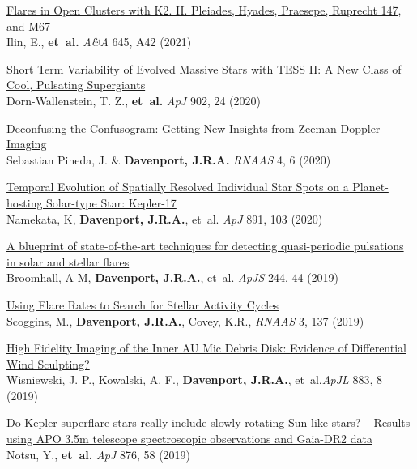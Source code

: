 \documentclass{article}
\begin{document}
\begin{llist}
\begin{etaremune}[leftmargin=10pt]
\item{\sc \href{https://arxiv.org/abs/2010.05576}{\color{blue} Flares in Open Clusters with K2. II. Pleiades, Hyades, Praesepe, Ruprecht 147, and M67}}\\
Ilin, E., {\bf et~al.} {\em A\&A} 645, A42 (2021)


\item{\sc \href{https://arxiv.org/abs/2008.11723}{\color{blue} Short Term Variability of Evolved Massive Stars with TESS II: A New Class of Cool, Pulsating Supergiants }}\\
Dorn-Wallenstein, T. Z., {\bf et~al.} {\em ApJ} 902, 24 (2020)

\item{\sc \href{https://iopscience.iop.org/article/10.3847/2515-5172/ab98f4}{\color{blue} Deconfusing the Confusogram: Getting New Insights from Zeeman Doppler Imaging}}\\
Sebastian Pineda, J. \& {\bf Davenport,  J.R.A.} {\em RNAAS} 4, 6 (2020)

\item{\sc \href{https://ui.adsabs.harvard.edu/abs/2020ApJ...891..103N}{\color{blue} Temporal Evolution of Spatially Resolved Individual Star Spots on a Planet-hosting Solar-type Star: Kepler-17}}\\
Namekata, K, {\bf Davenport,  J.R.A.}, et~al. {\em ApJ} 891, 103 (2020)


\item{\sc \href{https://arxiv.org/abs/1910.08458}{\color{blue} A blueprint of state-of-the-art techniques for detecting quasi-periodic pulsations in solar and stellar flares}}\\
Broomhall, A-M, {\bf Davenport,  J.R.A.}, et~al. {\em ApJS} 244, 44 (2019)

\item{\sc \href{https://doi.org/10.3847/2515-5172/ab45a0}{\color{blue}Using Flare Rates to Search for Stellar Activity Cycles}}\\
Scoggins, M., {\bf Davenport, J.R.A.}, Covey, K.R., {\em RNAAS} 3, 137 (2019)


\item{\sc\href{http://arxiv.org/abs/1907.10113}{\color{blue}High Fidelity Imaging of the Inner AU Mic Debris Disk: Evidence of Differential Wind Sculpting?}}\\
Wisniewski, J. P., Kowalski, A. F., {\bf Davenport,  J.R.A.}, et~al.{\em ApJL} 883, 8 (2019)

\item{\sc\href{https://arxiv.org/abs/1904.00142}{\color{blue}Do Kepler superflare stars really include slowly-rotating Sun-like stars? -- Results using APO 3.5m telescope spectroscopic observations and Gaia-DR2 data }}\\
Notsu, Y., {\bf et~al.} {\em ApJ} 876, 58 (2019)


\end{etaremune}
\end{llist}
\end{document}
